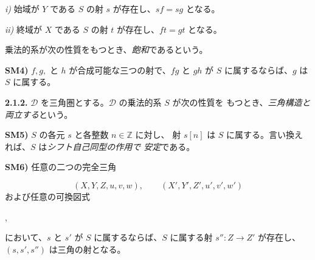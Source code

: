 
\clearpage
{}%
\begingroup
\small
\setlength{\emergencystretch}{1.5em}%
\setlength{\abovedisplayskip}{3pt plus 2pt minus 2pt}%
\setlength{\belowdisplayskip}{3pt plus 2pt minus 2pt}%

\noindent\textit{i)} 始域が $Y$ である $S$ の射 $s$ が存在し、$sf=sg$ となる。

\noindent\textit{ii)} 終域が $X$ である $S$ の射 $t$ が存在し、$ft=gt$ となる。

\noindent 乗法的系が次の性質をもつとき、\emph{飽和}であるという。

\smallskip
\noindent\textbf{SM4)} $f,g,$ と $h$ が合成可能な三つの射で、$fg$ と $gh$
が $S$ に属するならば、$g$ は $S$ に属する。

\medskip
\noindent\textbf{2.1.2.}\quad
{}
$\mathcal D$ を三角圏とする。$\mathcal D$ の乗法的系 $S$ が次の性質を
もつとき、\emph{三角構造と両立する}という。

\smallskip
\noindent\textbf{SM5)} $S$ の各元 $s$ と各整数 $n\in\mathbb Z$ に対し、
射 $s[n]$ は $S$ に属する。言い換えれば、$S$ は\emph{シフト自己同型の作用で
安定}である。

\smallskip
\noindent\textbf{SM6)} 任意の二つの完全三角

\[
  (X,Y,Z,u,v,w), \qquad (X',Y',Z',u',v',w')
\]
\noindent および任意の可換図式

\begin{center}
  \quad ,
\end{center}
\noindent において、$s$ と $s'$ が $S$ に属するならば、$S$ に属する射
$s''\colon Z\to Z'$ が存在し、$(s,s',s'')$ は三角の射となる。


